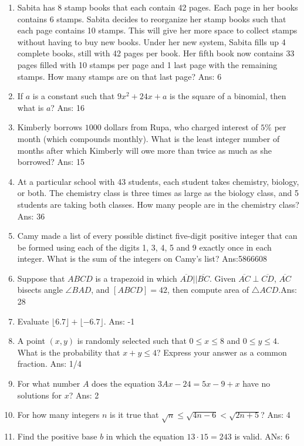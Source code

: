 \documentclass{article}
\begin{document}
\begin{enumerate}
    \item Sabita has 8 stamp books that each contain 42 pages. Each page in her books contains 6 stamps. Sabita decides to reorganize her stamp books such that each page contains 10 stamps. This will give her more space to collect stamps without having to buy new books. Under her new system, Sabita fills up 4 complete books, still with 42 pages per book. Her fifth book now contains 33 pages filled with 10 stamps per page and 1 last page with the remaining stamps. How many stamps are on that last page? Ans: 6
    \item If $a$ is a constant such that $9x^2 + 24x + a$ is the square of a binomial, then what is $a$? Ans: 16
    \item Kimberly borrows $1000$ dollars from Rupa, who charged interest of $5\%$ per month (which compounds monthly). What is the least integer number of months after which Kimberly will owe more than twice as much as she borrowed? Ans: 15
    \item At a particular school with 43 students, each student takes chemistry, biology, or both. The chemistry class is three times as large as the biology class, and 5 students are taking both classes. How many people are in the chemistry class? Ans: 36
    \item Camy made a list of every possible distinct five-digit positive integer that can be formed using each of the digits 1, 3, 4, 5 and 9 exactly once in each integer. What is the sum of the integers on Camy's list? Ans:5866608
    \item Suppose that $ABCD$ is a trapezoid in which $\overline{AD}|| \overline{BC}$. Given $\overline{AC}\perp\overline{CD}$, $\overline{AC}$ bisects angle $\angle BAD$, and $[ABCD]=42$, then compute area of $\triangle ACD$.Ans: 28
    \item Evaluate $\lfloor6.7\rfloor+\lfloor-6.7\rfloor$. Ans: -1
    \item A point $(x,y)$ is randomly selected such that $0 \le x \le 8$ and $0 \le y \le 4$. What is the probability that $x+y \le 4$? Express your answer as a common fraction. Ans: 1/4
    \item For what number $A$ does the equation $3Ax - 24 = 5x - 9 + x$ have no solutions for $x$? Ans: 2
    \item For how many integers $n$ is it true that $\sqrt{n} \le \sqrt{4n - 6} < \sqrt{2n + 5}$? Ans: 4
    \item Find the positive base $b$ in which the equation $13\cdot15=243$ is valid. ANs: 6

\end{enumerate}
\end{document}
